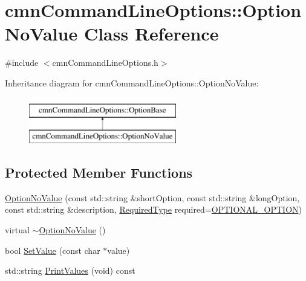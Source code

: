 \hypertarget{classcmn_command_line_options_1_1_option_no_value}{\section{cmn\-Command\-Line\-Options\-:\-:Option\-No\-Value Class Reference}
\label{classcmn_command_line_options_1_1_option_no_value}
}


{\ttfamily \#include $<$cmn\-Command\-Line\-Options.\-h$>$}

Inheritance diagram for cmn\-Command\-Line\-Options\-:\-:Option\-No\-Value\-:\begin{figure}[H]
\begin{center}
\leavevmode
\includegraphics[height=2.000000cm]{df/d0d/classcmn_command_line_options_1_1_option_no_value}
\end{center}
\end{figure}
\subsection*{Protected Member Functions}
\begin{DoxyCompactItemize}
\item 
\hyperlink{classcmn_command_line_options_1_1_option_no_value_abbc22ac6ee5894a304bcb0406f6cb3ec}{Option\-No\-Value} (const std\-::string \&short\-Option, const std\-::string \&long\-Option, const std\-::string \&description, \hyperlink{classcmn_command_line_options_ac239a3ca62dd4e3b391824f6f1a97c76}{Required\-Type} required=\hyperlink{classcmn_command_line_options_ac239a3ca62dd4e3b391824f6f1a97c76a6734a70bf0045a4c08605f3ae473d533}{O\-P\-T\-I\-O\-N\-A\-L\-\_\-\-O\-P\-T\-I\-O\-N})
\item 
virtual \hyperlink{classcmn_command_line_options_1_1_option_no_value_a8603a701052a041e6b199a1559536911}{$\sim$\-Option\-No\-Value} ()
\item 
bool \hyperlink{classcmn_command_line_options_1_1_option_no_value_ad033bac0fb01cf076f726f9461d9a484}{Set\-Value} (const char $\ast$value)
\item 
std\-::string \hyperlink{classcmn_command_line_options_1_1_option_no_value_aa25bb1ba7209a184281deb2d376dd7a1}{Print\-Values} (void) const 
\end{DoxyCompactItemize}
